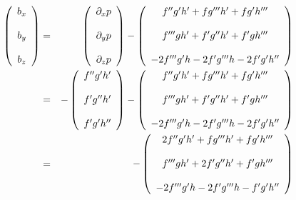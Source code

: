 \begin{eqnarray}
\left(
\begin{array}{c}
b_x \\ \\ b_y \\ \\ b_z
\end{array}
\right) 
&=&
\left(
\begin{array}{c}
\partial_x p \\ \\
\partial_y p \\ \\
\partial_z p 
\end{array}
\right) 
-
\left(
\begin{array}{c}
f''g' h'  + fg''' h'  +  fg'h'''   \\ \\
f''' g h' + f'g'' h'  +  f'gh'''  \\ \\
-2f''' g' h     -2f' g''' h -2f'g'h''
\end{array}
\right) 
\nonumber\\
&=& 
-
\left(
\begin{array}{c}
f''g'h' \\ \\
f'g''h' \\ \\
f'g'h''
\end{array}
\right) 
-
\left(
\begin{array}{c}
f''g' h'  + fg''' h'  +  fg'h'''   \\ \\
f''' g h' + f'g'' h'  +  f'gh'''  \\ \\
-2f''' g' h     -2f' g''' h -2f'g'h''
\end{array}
\right)  \nonumber\\
&=& 
-
\left(
\begin{array}{c}
2f''g' h'  + fg''' h'  +  fg'h'''   \\ \\
f''' g h' + 2f'g'' h'  +  f'gh'''  \\ \\
-2f''' g' h     -2f' g''' h - f'g'h''
\end{array}
\right) 
\end{eqnarray}

